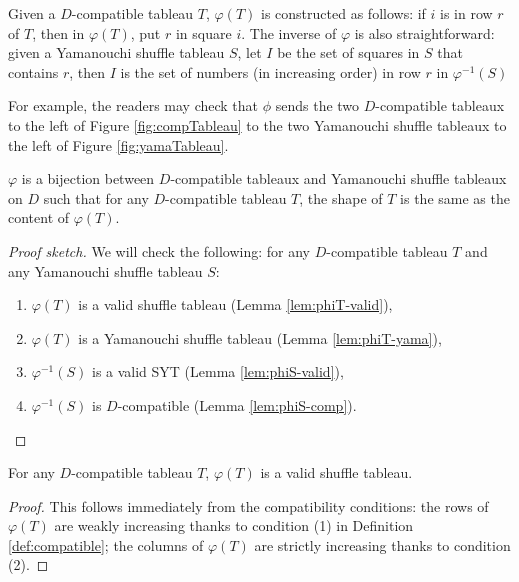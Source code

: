 \documentclass[ALCO,Unicode]{cedram}
\begin{document}
    \begin{defi}\label{def:yama-comp-bijection}
        Given a $D$-compatible tableau $T$, $\varphi(T)$ is constructed as follows: if $i$ is in row $r$ of $T$, then in $\varphi(T)$, put $r$ in square $i$. The inverse of $\varphi$ is also straightforward: given a Yamanouchi shuffle tableau $S$, let $I$ be the set of squares in $S$ that contains $r$, then $I$ is the set of numbers (in increasing order) in row $r$ in $\varphi^{-1}(S)$
    \end{defi}

    For example, the readers may check that $\phi$ sends the two $D$-compatible tableaux to the left of Figure \ref{fig:compTableau} to the two Yamanouchi shuffle tableaux to the left of Figure \ref{fig:yamaTableau}.

    \begin{prop}
        $\varphi$ is a bijection between $D$-compatible tableaux and Yamanouchi shuffle tableaux on $D$ such that for any $D$-compatible tableau $T$, the shape of $T$ is the same as the content of $\varphi(T)$.
    \end{prop}

    \begin{proof}[Proof sketch]
        We will check the following: for any $D$-compatible tableau $T$ and any Yamanouchi shuffle tableau $S$:

        \begin{enumerate}
            \item $\varphi(T)$ is a valid shuffle tableau (Lemma \ref{lem:phiT-valid}),
            \item $\varphi(T)$ is a Yamanouchi shuffle tableau (Lemma \ref{lem:phiT-yama}),
            \item $\varphi^{-1}(S)$ is a valid SYT (Lemma \ref{lem:phiS-valid}),
            \item $\varphi^{-1}(S)$ is $D$-compatible (Lemma \ref{lem:phiS-comp}). \qedhere
        \end{enumerate}
    \end{proof}

    \begin{lemma}\label{lem:phiT-valid}
        For any $D$-compatible tableau $T$, $\varphi(T)$ is a valid shuffle tableau.
    \end{lemma}

    \begin{proof}
        This follows immediately from the compatibility conditions: the rows of $\varphi(T)$ are weakly increasing thanks to condition (1) in Definition \ref{def:compatible}; the columns of $\varphi(T)$ are strictly increasing thanks to condition (2).
    \end{proof}
\end{document}
